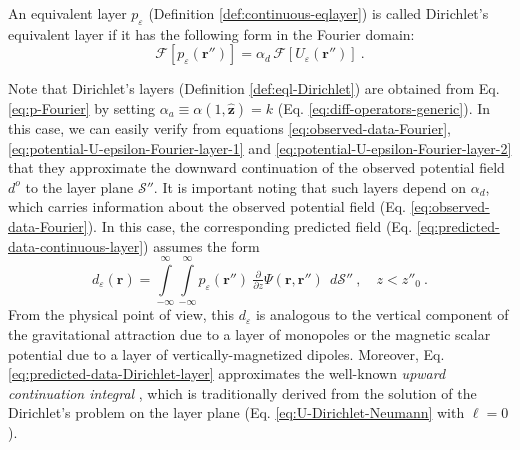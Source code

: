 \begin{definition}
	An equivalent layer $p_{\varepsilon}$ (Definition \ref{def:continuous-eqlayer}) is called Dirichlet's equivalent 
	layer if it has the following form in the Fourier domain:
	\begin{equation}
		\mathcal{F} [ p_{\varepsilon}(\mathbf{r}'') ] =
		\alpha_{d} \, \mathcal{F} [ U_{\varepsilon}(\mathbf{r}'') ]  \: .
		\label{eq:p-Fourier-Dirichlet}
	\end{equation}
	\label{def:eql-Dirichlet}
\end{definition}
Note that Dirichlet's layers (Definition \ref{def:eql-Dirichlet}) are obtained from 
Eq. \ref{eq:p-Fourier} by setting $\alpha_{a} \equiv \alpha(1, \hat{\mathbf{z}}) = k$ 
(Eq. \ref{eq:diff-operators-generic}).
In this case, we can easily verify from equations \ref{eq:observed-data-Fourier},
\ref{eq:potential-U-epsilon-Fourier-layer-1} and \ref{eq:potential-U-epsilon-Fourier-layer-2} that they 
approximate the downward continuation of the observed potential field $d^{o}$ to the layer plane $\mathcal{S}''$.
It is important noting that such layers depend on $\alpha_{d}$, which 
carries information about the observed potential field (Eq. \ref{eq:observed-data-Fourier}).
In this case, the corresponding predicted field (Eq. \ref{eq:predicted-data-continuous-layer}) assumes the form
\begin{equation}
	d_{\varepsilon}(\mathbf{r})
	= \int\limits_{-\infty}^{\infty}\int\limits_{-\infty}^{\infty}
	p_{\varepsilon}(\mathbf{r}'') \: \tfrac{\partial}{\partial z} \Psi(\mathbf{r}, \mathbf{r}'') \:\: d\mathcal{S}''
	\: , \quad z < z''_{0} \: .
	\label{eq:predicted-data-Dirichlet-layer}
\end{equation}
From the physical point of view, this $d_{\varepsilon}$ is analogous
to the vertical component of the gravitational attraction due to a layer of monopoles
or the magnetic scalar potential due to a layer of vertically-magnetized dipoles.
Moreover, Eq. \ref{eq:predicted-data-Dirichlet-layer} approximates the well-known \textit{upward continuation integral} 
\citep[e.g.,][]{skeels1947, peters1949, henderson-zietz1949, dean1958, roy1962, bhattacharyya1967, henderson1970},
which is traditionally derived from the solution of the Dirichlet’s problem on the
layer plane (Eq. \ref{eq:U-Dirichlet-Neumann} with $\ell = 0$). 

